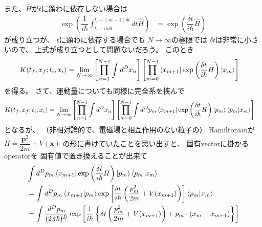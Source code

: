 また、$\hat{H}$が$t$に顕わに依存しない場合は
\begin{align}
    \exp\left(
        \dfrac{1}{i\hbar}
        \int_{t_i + m \delta t}
        ^{t_i + (m+1) \delta t}
        dt \hat{H}
    \right)
&=
    \exp\left(
        \dfrac{
            \delta t
        }{i\hbar}
        \hat{H}
    \right)
\end{align}
が成り立つが、
$t$に顕わに依存する場合でも
$N \to \infty$の極限では
$\delta t$は非常に小さいので、
上式が成り立つとして問題ないだろう。
このとき
\begin{align}
    K( t_f, x_f ; t_i, x_i )
    &=
    \lim_{ N \to \infty }
    \left[
        \prod_{n=1}^{N-1}
        \int d^D x_n
    \right]
    \left[
        \prod_{m=0}^{N-1}
        \bra{ x_{m+1} }
        \exp\left(
            \dfrac{
                \delta t
            }{i\hbar}
            H
        \right)
        \ket{ x_m }
    \right]
\end{align}
を得る。
さて、運動量についても同様に完全系を挟んで
\begin{align}
    K( t_f, x_f ; t_i, x_i )
    &=
    \lim_{ N \to \infty }
    \left[
        \prod_{n=1}^{N-1}
        \int
            d^D x_n
    \right]
    \left[
        \prod_{m=0}^{N-1}
        \int d^D p_m
        \bra{ x_{m+1} }
        \exp\left(
            \dfrac{
                \delta t
            }{i\hbar}
            H
        \right)
        \ket{ p_m }
        \braket{ p_m | x_m }
    \right]
\end{align}
となるが、
（非相対論的で、電磁場と相互作用のない粒子の）
Hamiltonianが
$H =
    \dfrac{ \bm{p}^2 }{ 2m }
    +
    V( \bm{x} )$
の形に書けていたことを思い出すと、
固有vectorに掛かるoperatorを
固有値で置き換えることが出来て
\begin{align}
    &
    \int d^D p_m
    \bra{ x_{m+1} }
        \exp\left(
            \dfrac{
                \delta t
            }{i\hbar}
            H
        \right)
    \ket{ p_m }
    \braket{ p_m | x_m }
\notag\\&=
    \int d^D p_m
    \braket{ x_{m+1} | p_m }
    \exp\left[
        \dfrac{
            \delta t
        }{i\hbar}
        \left(
            \dfrac{ p^2_m }{ 2m }
            +
            V( x_{m+1} )        
        \right)
    \right]
    \braket{ p_m | x_m }
\notag\\&=
    \int
    \dfrac{ d^D p_m }{ (2 \pi \hbar)^{D} }
    \exp\left[
        \dfrac{ 1 }{i\hbar}
        \left\{
            \delta t
            \left(
                \dfrac{ p^2_m }{ 2m }
            +
                V( x_{m+1} )        
            \right)
            +
            p_m \cdot
            \left(
                x_{m}
                -
                x_{m+1}
            \right)
        \right\}
    \right]
\end{align}
